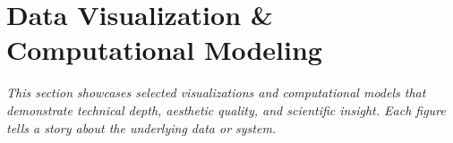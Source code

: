 
\section*{Data Visualization \& Computational Modeling}

\vspace{0.5em}

\textit{This section showcases selected visualizations and computational models that demonstrate technical depth, aesthetic quality, and scientific insight. Each figure tells a story about the underlying data or system.}

\vspace{1em}


\vspace{2em}

\newpage

\vspace{2em}


